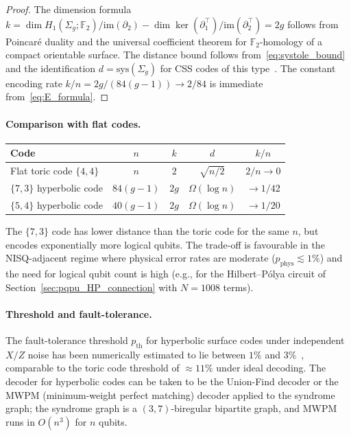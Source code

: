 \documentclass[11pt,oneside]{amsbook}
\numberwithin{equation}{section}
\theoremstyle{plain}
\theoremstyle{definition}
\theoremstyle{remark}
\begin{document}
\begin{proof}
The dimension formula $k = \dim H_1(\Sigma_g;\mathbb{F}_2)/\mathrm{im}(\partial_2)
- \dim\ker(\partial_1^\top)/\mathrm{im}(\partial_2^\top) = 2g$ follows from
Poincar\'e duality and the universal coefficient theorem for
$\mathbb{F}_2$-homology of a compact orientable surface.  The distance bound
follows from~\eqref{eq:systole_bound} and the identification $d = \mathrm{sys}(\Sigma_g)$
for CSS codes of this type~\cite{Freedman2002}.  The constant encoding rate
$k/n = 2g/(84(g-1)) \to 2/84$ is immediate from~\eqref{eq:E_formula}.
\end{proof}

\paragraph{Comparison with flat codes.}
\begin{center}
\renewcommand{\arraystretch}{1.4}
\begin{tabular}{lcccc}
\toprule
\textbf{Code} & $n$ & $k$ & $d$ & $k/n$ \\
\midrule
Flat toric code $\{4,4\}$ & $n$ & $2$ & $\sqrt{n/2}$ & $2/n \to 0$ \\
$\{7,3\}$ hyperbolic code & $84(g-1)$ & $2g$ & $\Omega(\log n)$ & $\to 1/42$ \\
$\{5,4\}$ hyperbolic code & $40(g-1)$ & $2g$ & $\Omega(\log n)$ & $\to 1/20$ \\
\bottomrule
\end{tabular}
\end{center}
The $\{7,3\}$ code has lower distance than the toric code for the same $n$,
but encodes exponentially more logical qubits.  The trade-off is favourable
in the NISQ-adjacent regime where physical error rates are moderate
($p_{\mathrm{phys}} \lesssim 1\%$) and the need for logical qubit count
is high (e.g., for the Hilbert--P\'olya circuit of Section~\ref{sec:pqpu_HP_connection}
with $N = 1008$ terms).

\paragraph{Threshold and fault-tolerance.}
The fault-tolerance threshold $p_{\mathrm{th}}$ for hyperbolic surface codes under
independent $X/Z$ noise has been numerically estimated to lie between
$1\%$ and $3\%$~\cite{BombinDelgado2007,Delfosse2013}, comparable to the
toric code threshold of $\approx 11\%$ under ideal decoding.  The decoder
for hyperbolic codes can be taken to be the Union-Find decoder or the
MWPM (minimum-weight perfect matching) decoder applied to the syndrome
graph; the syndrome graph is a $(3,7)$-biregular bipartite graph,
and MWPM runs in $O(n^3)$ for $n$ qubits.
\end{document}
